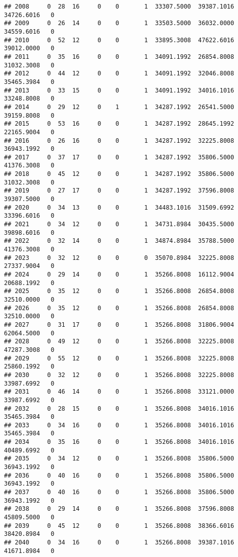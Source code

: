 \documentclass[
]{article}
\begin{document}
\begin{enumerate}
\begin{verbatim}
## 2008     0  28  16     0    0       1  33307.5000  39387.1016  34726.6016   0
## 2009     0  26  14     0    0       1  33503.5000  36032.0000  34559.6016   0
## 2010     0  52  12     0    0       1  33895.3008  47622.6016  39012.0000   0
## 2011     0  35  16     0    0       1  34091.1992  26854.8008  31032.3008   0
## 2012     0  44  12     0    0       1  34091.1992  32046.8008  35465.3984   0
## 2013     0  33  15     0    0       1  34091.1992  34016.1016  33248.8008   0
## 2014     0  29  12     0    1       1  34287.1992  26541.5000  39159.8008   0
## 2015     0  53  16     0    0       1  34287.1992  28645.1992  22165.9004   0
## 2016     0  26  16     0    0       1  34287.1992  32225.8008  36943.1992   0
## 2017     0  37  17     0    0       1  34287.1992  35806.5000  41376.3008   0
## 2018     0  45  12     0    0       1  34287.1992  35806.5000  31032.3008   0
## 2019     0  27  17     0    0       1  34287.1992  37596.8008  39307.5000   0
## 2020     0  34  13     0    0       1  34483.1016  31509.6992  33396.6016   0
## 2021     0  34  12     0    0       1  34731.8984  30435.5000  39898.6016   0
## 2022     0  32  14     0    0       1  34874.8984  35788.5000  41376.3008   0
## 2023     0  32  12     0    0       0  35070.8984  32225.8008  27337.9004   0
## 2024     0  29  14     0    0       1  35266.8008  16112.9004  20688.1992   0
## 2025     0  35  12     0    0       1  35266.8008  26854.8008  32510.0000   0
## 2026     0  35  12     0    0       1  35266.8008  26854.8008  32510.0000   0
## 2027     0  31  17     0    0       1  35266.8008  31806.9004  62064.5000   0
## 2028     0  49  12     0    0       1  35266.8008  32225.8008  47287.3008   0
## 2029     0  55  12     0    0       1  35266.8008  32225.8008  25860.1992   0
## 2030     0  32  12     0    0       1  35266.8008  32225.8008  33987.6992   0
## 2031     0  46  14     0    0       1  35266.8008  33121.0000  33987.6992   0
## 2032     0  28  15     0    0       1  35266.8008  34016.1016  35465.3984   0
## 2033     0  34  16     0    0       1  35266.8008  34016.1016  35465.3984   0
## 2034     0  35  16     0    0       1  35266.8008  34016.1016  40489.6992   0
## 2035     0  34  12     0    0       1  35266.8008  35806.5000  36943.1992   0
## 2036     0  40  16     0    0       1  35266.8008  35806.5000  36943.1992   0
## 2037     0  40  16     0    0       1  35266.8008  35806.5000  36943.1992   0
## 2038     0  29  14     0    0       1  35266.8008  37596.8008  45809.5000   0
## 2039     0  45  12     0    0       1  35266.8008  38366.6016  38420.8984   0
## 2040     0  34  16     0    0       1  35266.8008  39387.1016  41671.8984   0

\end{verbatim}
\end{enumerate}
\end{document}
